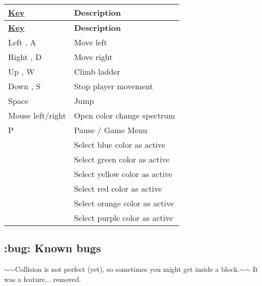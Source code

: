 \tabulinesep=1mm
\begin{longtabu} spread 0pt [c]{*{2}{|X[-1]}|}
\hline
\rowcolor{\tableheadbgcolor}\textbf{ {\bfseries \hyperlink{class_key}{Key}} }&\textbf{ {\bfseries Description}  }\\
\endfirsthead
\hline
\endfoot
\hline
\rowcolor{\tableheadbgcolor}\textbf{ {\bfseries \hyperlink{class_key}{Key}} }&\textbf{ {\bfseries Description}  }\\
\endhead
{\ttfamily Left} , {\ttfamily A} &Move left \\
{\ttfamily Right} , {\ttfamily D} &Move right \\
{\ttfamily Up} , {\ttfamily W} &Climb ladder \\
{\ttfamily Down} , {\ttfamily S} &Stop player movement \\
{\ttfamily Space} &Jump \\
{\ttfamily Mouse left/right} &Open color change spectrum \\
{\ttfamily P} &Pause / Game Menu \\
{} &Select blue color as active \\
{} &Select green color as active \\
{} &Select yellow color as active \\
{} &Select red color as active \\
{} &Select orange color as active \\
{} &Select purple color as active \\
\end{longtabu}
\subsection*{\+:bug\+: Known bugs}


\begin{DoxyItemize}
\item $\sim$$\sim$\+Collision is not perfect (yet), so sometimes you might get inside a block.$\sim$$\sim$ It was a feature... removed. 
\end{DoxyItemize}
